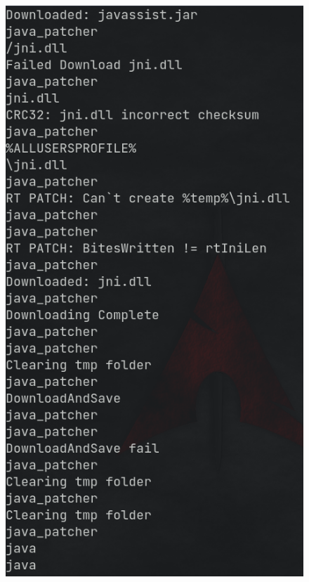 \documentclass[10pt,a4paper]{article}
\begin{document}
	\begin{figure}[!htbp]%
		\centering
		\includegraphics[width=\columnwidth]{pics/sus12.png}
	\end{figure}
\end{document}
